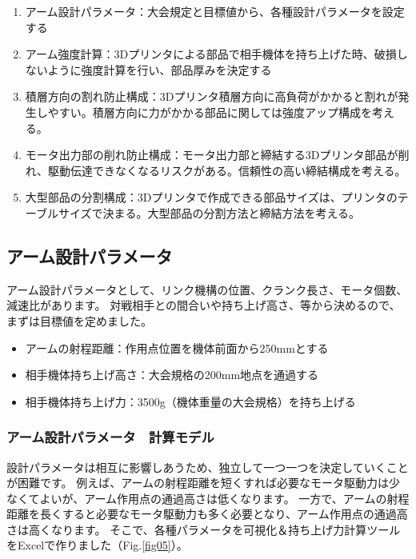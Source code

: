 \begin{enumerate}
\def\labelenumi{\arabic{enumi}.}
\tightlist
\item
  アーム設計パラメータ：大会規定と目標値から、各種設計パラメータを設定する
\item
  アーム強度計算：3Dプリンタによる部品で相手機体を持ち上げた時、破損しないように強度計算を行い、部品厚みを決定する
\item
  積層方向の割れ防止構成：3Dプリンタ積層方向に高負荷がかかると割れが発生しやすい。積層方向に力がかかる部品に関しては強度アップ構成を考える。
\item
  モータ出力部の削れ防止構成：モータ出力部と締結する3Dプリンタ部品が削れ、駆動伝達できなくなるリスクがある。信頼性の高い締結構成を考える。
\item
  大型部品の分割構成：3Dプリンタで作成できる部品サイズは、プリンタのテーブルサイズで決まる。大型部品の分割方法と締結方法を考える。
\end{enumerate}

\subsection{アーム設計パラメータ}\label{ux30a2ux30fcux30e0ux8a2dux8a08ux30d1ux30e9ux30e1ux30fcux30bf}

アーム設計パラメータとして、リンク機構の位置、クランク長さ、モータ個数、減速比があります。
対戦相手との間合いや持ち上げ高さ、等から決めるので、まずは目標値を定めました。

\begin{itemize}
\tightlist
\item
  アームの射程距離：作用点位置を機体前面から250mmとする
\item
  相手機体持ち上げ高さ：大会規格の200mm地点を通過する
\item
  相手機体持ち上げ力：3500g（機体重量の大会規格）を持ち上げる
\end{itemize}

\subsubsection{アーム設計パラメータ　計算モデル}\label{ux30a2ux30fcux30e0ux8a2dux8a08ux30d1ux30e9ux30e1ux30fcux30bfux8a08ux7b97ux30e2ux30c7ux30eb}

設計パラメータは相互に影響しあうため、独立して一つ一つを決定していくことが困難です。
例えば、アームの射程距離を短くすれば必要なモータ駆動力は少なくてよいが、アーム作用点の通過高さは低くなります。
一方で、アームの射程距離を長くすると必要なモータ駆動力も多く必要となり、アーム作用点の通過高さは高くなります。
そこで、各種パラメータを可視化＆持ち上げ力計算ツールをExcelで作りました（Fig.\ref{fig05}）。

